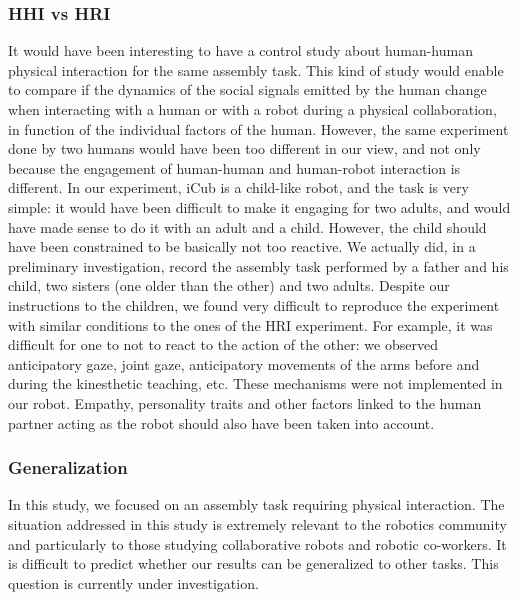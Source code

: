 \subsubsection{HHI vs HRI}

It would have been interesting to have a control study about human-human physical interaction for the same assembly task. This kind of study would enable to compare if the dynamics of the social signals emitted by the human change when interacting with a human or with a robot during a physical collaboration, in function of the individual factors of the human. 
However, the same experiment done by two humans would have been too different in our view, and not only because the engagement of human-human and human-robot interaction is different.
In our experiment, iCub is a child-like robot, and the task is very simple: it would have been difficult to make it engaging for two adults, and would have made sense to do it with an adult and a child. However, the child should have been constrained to be basically not too reactive. 
We actually did, in a preliminary investigation, record the assembly task performed by a father and his child, two sisters (one older than the other) and two adults. Despite our instructions to the children, we found very difficult to reproduce the experiment with similar conditions to the ones of the HRI experiment. 
For example, 
it was difficult for one to not to react to the action of the other:
we observed anticipatory gaze, joint gaze, anticipatory movements of the arms before and during the kinesthetic teaching, etc. These mechanisms were not implemented in our robot. Empathy, personality traits and other factors linked to the human partner acting as the robot should also have been taken into account.


\subsubsection{Generalization}

In this study, we focused on an assembly task requiring physical interaction. The situation addressed in this study is extremely relevant to the robotics community and particularly to those studying collaborative robots and robotic co-workers. It is difficult to predict whether our results can be generalized to other tasks. This question is currently under investigation.

